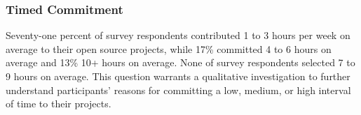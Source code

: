 \subsubsection{Timed Commitment} Seventy-one percent of survey respondents contributed 1 to 3 hours per week on average to their open source projects, while 17\%
committed 4 to 6 hours on average and 13\% 10+ hours on average. None of survey respondents selected 7 to 9 hours on average. This question warrants 
a qualitative investigation to further understand participants' reasons for committing a low, medium, or high interval of 
time to their projects. 